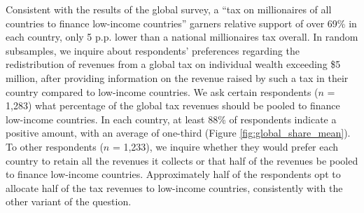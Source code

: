 \begin{bibunit}
Consistent with the results of the global survey, 
a ``tax on millionaires of all countries to finance low-income countries'' garners relative support of over 69\% in each country, only 5 p.p. lower than a national millionaires tax overall. In random subsamples, we inquire about respondents' preferences regarding the redistribution of revenues from a global tax on individual wealth exceeding \$5 million, after providing information on the revenue raised by such a tax in their country compared to low-income countries. 
We ask certain respondents ($n$ = 1,283) what percentage of the global tax revenues should be pooled to finance low-income countries. In each country, at least 88\% of respondents indicate a positive amount, with an average of one-third %
(Figure \ref{fig:global_share_mean}). To other respondents ($n$ = 1,233), we inquire whether they would prefer each country to retain all the revenues it collects or that half of the revenues be pooled to finance low-income countries. Approximately half of the respondents opt to allocate half of the tax revenues to low-income countries, consistently with the other variant of the question.







\end{bibunit}
